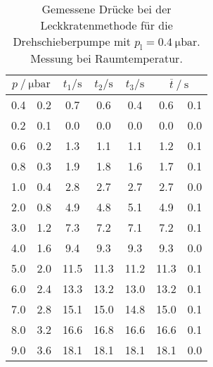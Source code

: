 \begin{table}
\centering
\caption{Gemessene Drücke bei der Leckkratenmethode für die Drehschieberpumpe mit $p_{\mathrm{l}}=\SI{0.4}{\micro\bar}$. Messung bei Raumtemperatur.}
\label{tab: leck_turbo_leck_0.4.pdf}
\begin{tabular}{S[table-format=1.1]@{${}\pm{}$} S[table-format=1.1] S S S S[table-format=1.1]@{${}\pm{}$} S[table-format=1.1] }
\toprule
{} & {$t_1 / \si{ \second}$} & {$t_2 / \si{ \second}$} & {$t_3 / \si{ \second}$} &  \\
 & 0.2 & 0.7 & 0.6 & 0.4 & 0.6 & 0.1\\
0.2 & 0.1 & 0.0 & 0.0 & 0.0 & 0.0 & 0.0\\
0.6 & 0.2 & 1.3 & 1.1 & 1.1 & 1.2 & 0.1\\
0.8 & 0.3 & 1.9 & 1.8 & 1.6 & 1.7 & 0.1\\
1.0 & 0.4 & 2.8 & 2.7 & 2.7 & 2.7 & 0.0\\
2.0 & 0.8 & 4.9 & 4.8 & 5.1 & 4.9 & 0.1\\
3.0 & 1.2 & 7.3 & 7.2 & 7.1 & 7.2 & 0.1\\
4.0 & 1.6 & 9.4 & 9.3 & 9.3 & 9.3 & 0.0\\
5.0 & 2.0 & 11.5 & 11.3 & 11.2 & 11.3 & 0.1\\
6.0 & 2.4 & 13.3 & 13.2 & 13.0 & 13.2 & 0.1\\
7.0 & 2.8 & 15.1 & 15.0 & 14.8 & 15.0 & 0.1\\
8.0 & 3.2 & 16.6 & 16.8 & 16.6 & 16.6 & 0.1\\
9.0 & 3.6 & 18.1 & 18.1 & 18.1 & 18.1 & 0.0\\
\bottomrule
\end{tabular}
\end{table}
